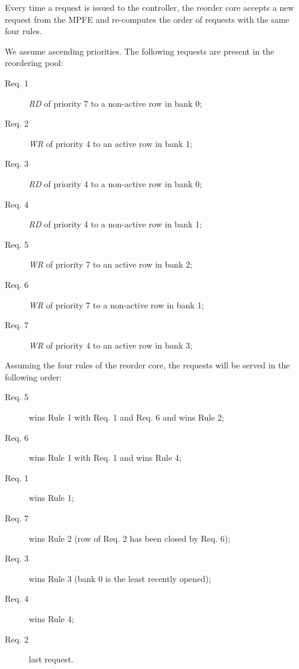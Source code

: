 \documentclass[main.tex]{subfiles}
\begin{document}
\begin{description}
        Every time a request is issued to the controller, the reorder core accepts a new request from the MPFE and re-computes the order of requests with the same four rules.

        \begin{example}
            We assume ascending priorities. The following requests are present in the reordering pool:
            \begin{description}
                \item[Req. 1] \emph{RD} of priority 7 to a non-active row in bank 0;
                \item[Req. 2] \emph{WR} of priority 4 to an active row in bank 1;
                \item[Req. 3] \emph{RD} of priority 4 to a non-active row in bank 0;
                \item[Req. 4] \emph{RD} of priority 4 to a non-active row in bank 1;
                \item[Req. 5] \emph{WR} of priority 7 to an active row in bank 2;
                \item[Req. 6] \emph{WR} of priority 7 to a non-active row in bank 1;
                \item[Req. 7] \emph{WR} of priority 4 to an active row in bank 3;
            \end{description}

            Assuming the four rules of the reorder core, the requests will be served in the following order:
            \begin{description}
                \item[Req. 5] wins Rule 1 with Req. 1 and Req. 6 and wins Rule 2;
                \item[Req. 6] wins Rule 1 with Req. 1 and wins Rule 4;
                \item[Req. 1] wins Rule 1;
                \item[Req. 7] wins Rule 2 (row of Req. 2 has been closed by Req. 6);
                \item[Req. 3] wins Rule 3 (bank 0 is the least recently opened);
                \item[Req. 4] wins Rule 4;
                \item[Req. 2] last request.
            \end{description}
        \end{example}
\end{description}
\end{document}
